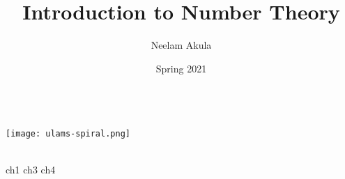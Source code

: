 \documentclass[fullpage]{article}
\title{Introduction to Number Theory}
\author{Neelam Akula}
\date{Spring 2021}
\newif\ifintro
\begin{document}
\makeatletter
    \begin{titlepage}
        \begin{center}
            {\huge \bfseries  \@title }\\[4ex]
			\texttt{[image: ulams-spiral.png]}\\[4ex]
            {\large  \@author}\\[4ex] 
            {\large \@date}
        \end{center}
    \end{titlepage}
\makeatother

\tableofcontents
\newpage

\ifintro
\section*{Introduction}
\rule{\textwidth}{1pt}
\vspace{1.5in}
\paragraph{}
    This is a compilation of notes and homeworks for MATH 406,
    Introduction to Number Theory, to aid both current and future students
    in fully understanding the material. 
    The primary text used is \emph{Elementary Number Theory}, by Kenneth H. Rosen, 6th
    Edition. While the text is not required it is an excellent resource for additional
    problems. Chapters covered from the text are 1, 3, 4, 6, 7, 9, 8, and 11 in that order. With two
    midterms following chapters 1, 3, 4 and chapters 6, 7, 9. The final is cumulative with an
    emphasis on chapters 8 and 11.
    Lastly, the course is taught by Dr. Justin Wyss-Gallifent, on his personal site there are
    brief versions of each section's lecture notes. A list of his notes can be found
    \href{https://www.math.umd.edu/~immortal/MATH406/}{here}.
\addcontentsline{toc}{section}{Introduction}
\newpage
\fi

{ch1}
\newpage
{ch3}
\newpage
{ch4}
\newpage
\end{document}
